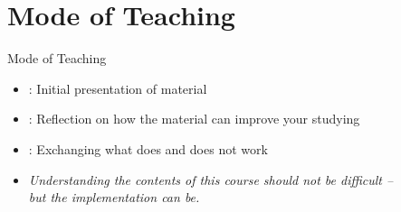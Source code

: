 \documentclass{ercisbeamer}
\begin{document}
\section{Mode of Teaching}
\begin{frame}{Mode of Teaching}
    \begin{itemize}
        \item {}: Initial presentation of material
        \item {}: Reflection on how the material can improve your studying
        \item {}: Exchanging what does and does not work
        \item \emph{Understanding the contents of this course should not be difficult -- \\ but the implementation can be.}
    \end{itemize}
\end{frame}
\end{document}
